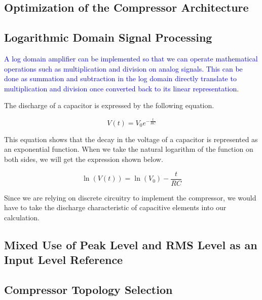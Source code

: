 \documentclass[10pt]{article}
\begin{document}
\begin{multicols*}{2}
\begin{minipage}{\linewidth}
                \end{minipage}
        
        \section{Optimization of the Compressor Architecture}
            
            \subsection{Logarithmic Domain Signal Processing}
                \textcolor{blue}{A log domain amplifier can be implemented so that we can operate mathematical operations such as multiplication and division on analog signals. This can be done as summation and subtraction in the log domain directly translate to multiplication and division once converted back to its linear representation.}

                The discharge of a capacitor is expressed by the following equation.              
                
                \begin{equation}
                    V(t) = V_0 e^{-\frac{t}{RC}}
                \end{equation}    
                
                This equation shows that the decay in the voltage of a capacitor is represented as an exponential function.
                When we take the natural logarithm of the function on both sides, we will get the expression shown below.
                
                \begin{equation}
                    \ln(V(t)) = \ln(V_0) - \frac{t}{RC}
                \end{equation}
                
                Since we are relying on discrete circuitry to implement the compressor, we would have to take the discharge characteristic of capacitive elements into our calculation.

            \subsection{Mixed Use of Peak Level and RMS Level as an Input Level Reference}

            \subsection{Compressor Topology Selection}


\end{multicols*}
\end{document}
